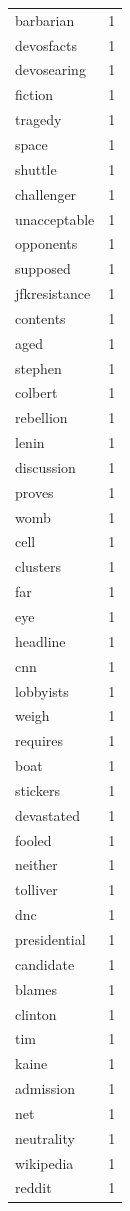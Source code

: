 \begin{tabular}{lr}
barbarian & 1 \\
devosfacts & 1 \\
devosearing & 1 \\
fiction & 1 \\
tragedy & 1 \\
space & 1 \\
shuttle & 1 \\
challenger & 1 \\
unacceptable & 1 \\
opponents & 1 \\
supposed & 1 \\
jfkresistance & 1 \\
contents & 1 \\
aged & 1 \\
stephen & 1 \\
colbert & 1 \\
rebellion & 1 \\
lenin & 1 \\
discussion & 1 \\
proves & 1 \\
womb & 1 \\
cell & 1 \\
clusters & 1 \\
far & 1 \\
eye & 1 \\
headline & 1 \\
cnn & 1 \\
lobbyists & 1 \\
weigh & 1 \\
requires & 1 \\
boat & 1 \\
stickers & 1 \\
devastated & 1 \\
fooled & 1 \\
neither & 1 \\
tolliver & 1 \\
dnc & 1 \\
presidential & 1 \\
candidate & 1 \\
blames & 1 \\
clinton & 1 \\
tim & 1 \\
kaine & 1 \\
admission & 1 \\
net & 1 \\
neutrality & 1 \\
wikipedia & 1 \\
reddit & 1 \\

\end{tabular}
